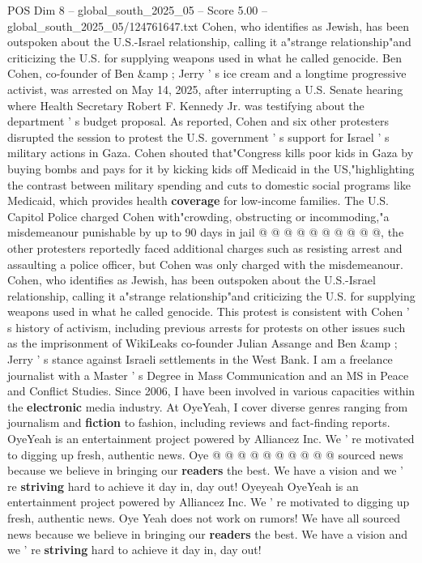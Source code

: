 \begin{textsample}{POS Dim 8 – global\_south\_2025\_05 – Score 5.00 – global\_south\_2025\_05/124761647.txt}  \label{ex:f8_pos_140}
Cohen, who identifies as Jewish, has been outspoken about the U.S.-Israel relationship, calling it a"strange relationship"and criticizing the U.S. for supplying weapons used in what he called genocide.
Ben Cohen, co-founder of Ben \&amp ; Jerry ' s ice cream and a longtime progressive activist, was arrested on May 14, 2025, after interrupting a U.S.
Senate hearing where Health Secretary Robert F.
Kennedy Jr. was testifying about the department ' s budget proposal.
As reported, Cohen and six other protesters disrupted the session to protest the U.S. government ' s support for Israel ' s military actions in Gaza.
Cohen shouted that"Congress kills poor kids in Gaza by buying bombs and pays for it by kicking kids off Medicaid in the US,"highlighting the contrast between military spending and cuts to domestic social programs like Medicaid, which provides health \textbf{coverage} for low-income families.
The U.S.
Capitol Police charged Cohen with"crowding, obstructing or incommoding,"a misdemeanour punishable by up to 90 days in jail @ @ @ @ @ @ @ @ @ @, the other protesters reportedly faced additional charges such as resisting arrest and assaulting a police officer, but Cohen was only charged with the misdemeanour.
Cohen, who identifies as Jewish, has been outspoken about the U.S.-Israel relationship, calling it a"strange relationship"and criticizing the U.S. for supplying weapons used in what he called genocide.
This protest is consistent with Cohen ' s history of activism, including previous arrests for protests on other issues such as the imprisonment of WikiLeaks co-founder Julian Assange and Ben \&amp ; Jerry ' s stance against Israeli settlements in the West Bank.
I am a freelance journalist with a Master ' s Degree in Mass Communication and an MS in Peace and Conflict Studies.
Since 2006, I have been involved in various capacities within the \textbf{electronic} media industry.
At OyeYeah, I cover diverse genres ranging from journalism and \textbf{fiction} to fashion, including reviews and fact-finding reports.
OyeYeah is an entertainment project powered by Alliancez Inc.
We ' re motivated to digging up fresh, authentic news.
Oye @ @ @ @ @ @ @ @ @ @ sourced news because we believe in bringing our \textbf{readers} the best.
We have a vision and we ' re \textbf{striving} hard to achieve it day in, day out!
Oyeyeah OyeYeah is an entertainment project powered by Alliancez Inc.
We ' re motivated to digging up fresh, authentic news.
Oye Yeah does not work on rumors!
We have all sourced news because we believe in bringing our \textbf{readers} the best.
We have a vision and we ' re \textbf{striving} hard to achieve it day in, day out!

\end{textsample}
